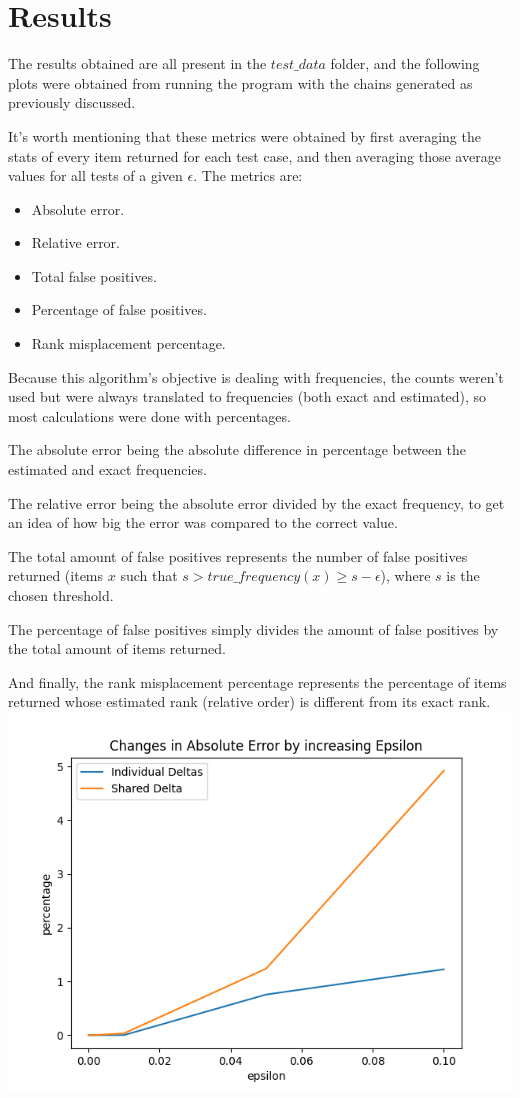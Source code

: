 \documentclass[...]{revdetua}
\begin{document}
\section{Results}
The results obtained are all present in the $test\_data$ folder, and the following plots were obtained from running the program with the chains generated as previously discussed.\par
It's worth mentioning that these metrics were obtained by first averaging the stats of every item returned for each test case, and then averaging those average values for all tests of a given $\epsilon$.
The metrics are:
\begin{itemize}
\item Absolute error.
\item Relative error.
\item Total false positives.
\item Percentage of false positives.
\item Rank misplacement percentage.
\end{itemize}
Because this algorithm's objective is dealing with frequencies, the counts weren't used but were always translated to frequencies (both exact and estimated), so most calculations were done with percentages.\par
The absolute error being the absolute difference in percentage between the estimated and exact frequencies.\par
The relative error being the absolute error divided by the exact frequency, to get an idea of how big the error was compared to the correct value.\par
The total amount of false positives represents the number of false positives returned (items $x$ such that $s > true\_frequency(x) \geq s-\epsilon$), where $s$ is the chosen threshold.\par
The percentage of false positives simply divides the amount of false positives by the total amount of items returned.\par
And finally, the rank misplacement percentage represents the percentage of items returned whose estimated rank (relative order) is different from its exact rank.
\includegraphics[scale=0.5]{absolute.png}
\end{document}
